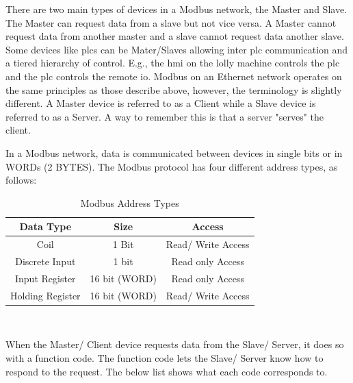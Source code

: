     There are two main types of devices in a Modbus network, the Master and Slave\cite{frenzel2015handbook}. The Master can request data from a slave but not vice versa. A Master cannot request data from another master and a slave cannot request data another slave. Some devices like \acrshort{plc}s can be Mater/Slaves allowing inter \acrshort{plc} communication and a tiered hierarchy of control. E.g., the \acrshort{hmi} on the lolly machine controls the \acrshort{plc} and the \acrshort{plc} controls the remote \acrshort{io}. Modbus on an Ethernet network operates on the same principles as those describe above, however, the terminology is slightly different. A Master device is referred to as a Client while a Slave device is referred to as a Server. A way to remember this is that a server "serves" the client.
    
    In a Modbus network, data is communicated between devices in single bits or in WORDs (2 BYTES). 
    The Modbus protocol has four different address types, as follows:
    
        \begin{table}[H]
        \caption{Modbus Address Types}
        \begin{center}
            \begin{tabular}{ |c|c|c| }
                \hline
                \textbf{Data Type} & \textbf{Size} & \textbf{Access}\\ 
                \hline
                Coil                & 1 Bit         & Read/ Write Access\\
                Discrete Input      & 1 bit         & Read only Access\\
                Input Register      & 16 bit (WORD) & Read only Access\\
                Holding Register        & 16 bit (WORD) & Read/ Write Access\\
                \hline
            \end{tabular}\\
        \end{center}
        \label{table:modbusAddressTypes}
    \end{table}
    
    When the Master/ Client device requests data from the Slave/ Server, it does so with a function code. The function code lets the Slave/ Server know how to respond to the request. The below list shows what each code corresponds to. 

